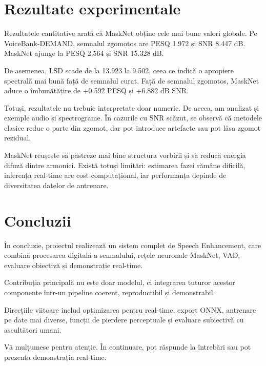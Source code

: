 \documentclass[12pt,a4paper]{article}
\begin{document}
\section*{Rezultate experimentale}

Rezultatele cantitative arată că MaskNet obține cele mai bune valori globale. Pe VoiceBank-DEMAND, semnalul zgomotos are PESQ 1.972 și SNR 8.447 dB. MaskNet ajunge la PESQ 2.564 și SNR 15.328 dB.

De asemenea, LSD scade de la 13.923 la 9.502, ceea ce indică o apropiere spectrală mai bună față de semnalul curat. Față de semnalul zgomotos, MaskNet aduce o îmbunătățire de +0.592 PESQ și +6.882 dB SNR.

Totuși, rezultatele nu trebuie interpretate doar numeric. De aceea, am analizat și exemple audio și spectrograme. În cazurile cu SNR scăzut, se observă că metodele clasice reduc o parte din zgomot, dar pot introduce artefacte sau pot lăsa zgomot rezidual.

MaskNet reușește să păstreze mai bine structura vorbirii și să reducă energia difuză dintre armonici. Există totuși limitări: estimarea fazei rămâne dificilă, inferența real-time are cost computațional, iar performanța depinde de diversitatea datelor de antrenare.

\section*{Concluzii}

În concluzie, proiectul realizează un sistem complet de Speech Enhancement, care combină procesarea digitală a semnalului, rețele neuronale MaskNet, VAD, evaluare obiectivă și demonstrație real-time.

Contribuția principală nu este doar modelul, ci integrarea tuturor acestor componente într-un pipeline coerent, reproductibil și demonstrabil.

Direcțiile viitoare includ optimizarea pentru real-time, export ONNX, antrenare pe date mai diverse, funcții de pierdere perceptuale și evaluare subiectivă cu ascultători umani.

Vă mulțumesc pentru atenție. În continuare, pot răspunde la întrebări sau pot prezenta demonstrația real-time.
\end{document}
